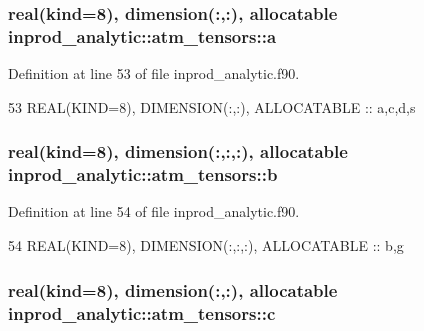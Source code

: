 \subsubsection[{\texorpdfstring{a}{a}}]{\setlength{\rightskip}{0pt plus 5cm}real(kind=8), dimension(\+:,\+:), allocatable inprod\+\_\+analytic\+::atm\+\_\+tensors\+::a\hspace{0.3cm}{\ttfamily [private]}}\hypertarget{structinprod__analytic_1_1atm__tensors_af50962da7a48c98d8b118dee9cc16dcd}{}\label{structinprod__analytic_1_1atm__tensors_af50962da7a48c98d8b118dee9cc16dcd}


Definition at line 53 of file inprod\+\_\+analytic.\+f90.


\begin{DoxyCode}
53      \textcolor{keywordtype}{REAL(KIND=8)}, \textcolor{keywordtype}{DIMENSION(:,:)}, \textcolor{keywordtype}{ALLOCATABLE} :: a,c,d,s
\end{DoxyCode}
\subsubsection[{\texorpdfstring{b}{b}}]{\setlength{\rightskip}{0pt plus 5cm}real(kind=8), dimension(\+:,\+:,\+:), allocatable inprod\+\_\+analytic\+::atm\+\_\+tensors\+::b\hspace{0.3cm}{\ttfamily [private]}}\hypertarget{structinprod__analytic_1_1atm__tensors_aa6b446e5bd3e7ea7278f1c1cad7f46cf}{}\label{structinprod__analytic_1_1atm__tensors_aa6b446e5bd3e7ea7278f1c1cad7f46cf}


Definition at line 54 of file inprod\+\_\+analytic.\+f90.


\begin{DoxyCode}
54      \textcolor{keywordtype}{REAL(KIND=8)}, \textcolor{keywordtype}{DIMENSION(:,:,:)}, \textcolor{keywordtype}{ALLOCATABLE} :: b,g
\end{DoxyCode}
\subsubsection[{\texorpdfstring{c}{c}}]{\setlength{\rightskip}{0pt plus 5cm}real(kind=8), dimension(\+:,\+:), allocatable inprod\+\_\+analytic\+::atm\+\_\+tensors\+::c\hspace{0.3cm}{\ttfamily [private]}}\hypertarget{structinprod__analytic_1_1atm__tensors_a6f560bb68ce7081409034cb755e7a164}{}\label{structinprod__analytic_1_1atm__tensors_a6f560bb68ce7081409034cb755e7a164}


